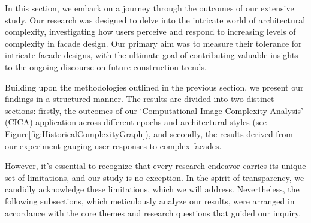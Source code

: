 %



In this section, we embark on a journey through the outcomes of our extensive study.
Our research was designed to delve into the intricate world of architectural complexity, investigating how users perceive and respond to increasing levels of complexity in facade design.
Our primary aim was to measure their tolerance for intricate facade designs, with the ultimate goal of contributing valuable insights to the ongoing discourse on future construction trends.

Building upon the methodologies outlined in the previous section, we present our findings in a structured manner.
The results are divided into two distinct sections: firstly, the outcomes of our `Computational Image Complexity Analysis' (CICA) application across different epochs and architectural styles (see Figure\ref{fig:HistoricalComplexityGraph}), and secondly, the results derived from our experiment gauging user responses to complex facades.

However, it's essential to recognize that every research endeavor carries its unique set of limitations, and our study is no exception.
In the spirit of transparency, we candidly acknowledge these limitations, which we will address.
Nevertheless, the following subsections, which meticulously analyze our results, were arranged in accordance with the core themes and research questions that guided our inquiry.



